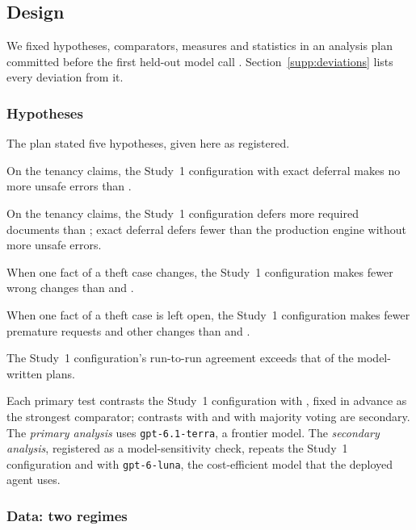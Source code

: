 \subsection{Design}
\label{sec:evaluation}

We fixed hypotheses, comparators, measures and statistics in an analysis plan committed before the first held-out model call \cite{casepath2026repo}. Section~\ref{supp:deviations} lists every deviation from it.

\subsubsection{Hypotheses}
\label{sec:hypotheses}

The plan stated five hypotheses, given here as registered.
\begin{description}[leftmargin=1.2em,labelindent=0pt]
\item[H1 Safety.] On the tenancy claims, the Study~1 configuration with exact deferral makes no more unsafe errors than .
\item[H2 Deferral.] On the tenancy claims, the Study~1 configuration defers more required documents than ; exact deferral defers fewer than the production engine without more unsafe errors.
\item[H3 Changed facts.] When one fact of a theft case changes, the Study~1 configuration makes fewer wrong changes than  and .
\item[H4 Unresolved facts.] When one fact of a theft case is left open, the Study~1 configuration makes fewer premature requests and other changes than  and .
\item[H5 Stability.] The Study~1 configuration's run-to-run agreement exceeds that of the model-written plans.
\end{description}
Each primary test contrasts the Study~1 configuration with , fixed in advance as the strongest comparator; contrasts with  and with majority voting are secondary. The \emph{primary analysis} uses \texttt{gpt-6.1-terra}, a frontier model. The \emph{secondary analysis}, registered as a model-sensitivity check, repeats the Study~1 configuration and  with \texttt{gpt-6-luna}, the cost-efficient model that the deployed agent uses.

\subsubsection{Data: two regimes}
\label{sec:data}

